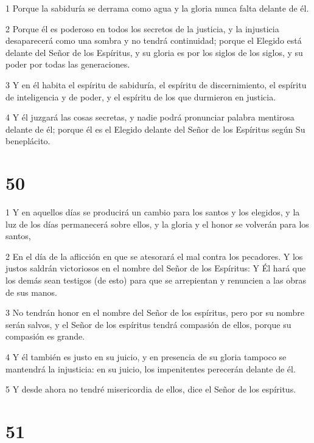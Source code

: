 \par 1 Porque la sabiduría se derrama como agua y la gloria nunca falta delante de él.
\par 2 Porque él es poderoso en todos los secretos de la justicia, y la injusticia desaparecerá como una sombra y no tendrá continuidad; porque el Elegido está delante del Señor de los Espíritus, y su gloria es por los siglos de los siglos, y su poder por todas las generaciones.
\par 3 Y en él habita el espíritu de sabiduría, el espíritu de discernimiento, el espíritu de inteligencia y de poder, y el espíritu de los que durmieron en justicia.
\par 4 Y él juzgará las cosas secretas, y nadie podrá pronunciar palabra mentirosa delante de él; porque él es el Elegido delante del Señor de los Espíritus según Su beneplácito.

\chapter{50}

\par 1 Y en aquellos días se producirá un cambio para los santos y los elegidos, y la luz de los días permanecerá sobre ellos, y la gloria y el honor se volverán para los santos,
\par 2 En el día de la aflicción en que se atesorará el mal contra los pecadores. Y los justos saldrán victoriosos en el nombre del Señor de los Espíritus: Y Él hará que los demás sean testigos (de esto) para que se arrepientan y renuncien a las obras de sus manos.
\par 3 No tendrán honor en el nombre del Señor de los espíritus, pero por su nombre serán salvos, y el Señor de los espíritus tendrá compasión de ellos, porque su compasión es grande.
\par 4 Y él también es justo en su juicio, y en presencia de su gloria tampoco se mantendrá la injusticia: en su juicio, los impenitentes perecerán delante de él.
\par 5 Y desde ahora no tendré misericordia de ellos, dice el Señor de los espíritus.

\chapter{51}

